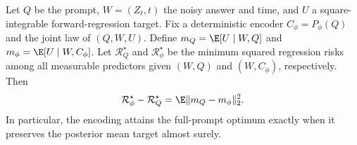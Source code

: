 \begin{lemma}
\label{lem:conditionalrepresentation}
Let $Q$ be the prompt, $W=(Z_t,t)$ the noisy answer and time, and $U$ a square-integrable forward-regression target. Fix a deterministic encoder $C_\phi=P_\phi(Q)$ and the joint law of $(Q,W,U)$. Define $m_Q=\E[U\mid W,Q]$ and $m_\phi=\E[U\mid W,C_\phi]$. Let $\mathcal R_Q^\star$ and $\mathcal R_\phi^\star$ be the minimum squared regression risks among all measurable predictors given $(W,Q)$ and $(W,C_\phi)$, respectively. Then
\begin{equation}
 \mathcal R_\phi^\star-\mathcal R_Q^\star
 =\E\|m_Q-m_\phi\|_2^2.
 \label{eq:conditioningrisk}
\end{equation}
In particular, the encoding attains the full-prompt optimum exactly when it preserves the posterior mean target almost surely.
\end{lemma}

